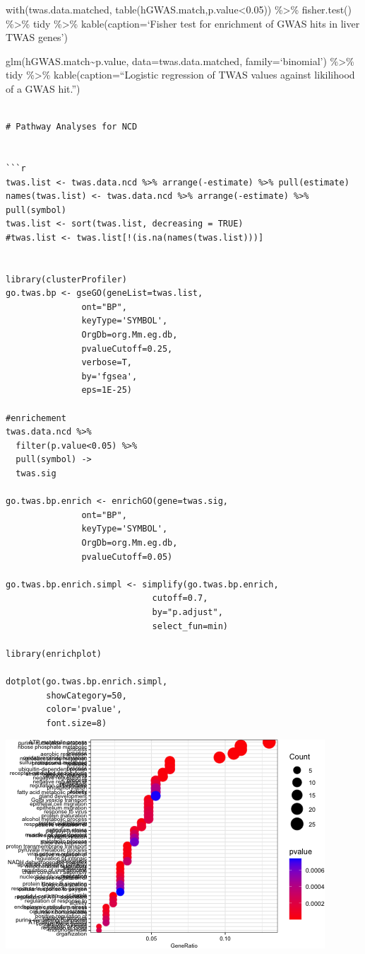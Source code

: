 \documentclass[
]{article}
\begin{document}
with(twas.data.matched, table(hGWAS.match,p.value\textless0.05))
\%\textgreater\% fisher.test() \%\textgreater\% tidy \%\textgreater\%
kable(caption=`Fisher test for enrichment of GWAS hits in liver TWAS
genes')

glm(hGWAS.match\textasciitilde p.value, data=twas.data.matched,
family=`binomial') \%\textgreater\% tidy \%\textgreater\%
kable(caption=``Logistic regression of TWAS values against likilihood of
a GWAS hit.'')

\begin{verbatim}

# Pathway Analyses for NCD


```r
twas.list <- twas.data.ncd %>% arrange(-estimate) %>% pull(estimate)
names(twas.list) <- twas.data.ncd %>% arrange(-estimate) %>% pull(symbol)
twas.list <- sort(twas.list, decreasing = TRUE)
#twas.list <- twas.list[!(is.na(names(twas.list)))]


library(clusterProfiler)
go.twas.bp <- gseGO(geneList=twas.list, 
               ont="BP", 
               keyType='SYMBOL',
               OrgDb=org.Mm.eg.db, 
               pvalueCutoff=0.25,
               verbose=T,
               by='fgsea',
               eps=1E-25)

#enrichement
twas.data.ncd %>% 
  filter(p.value<0.05) %>%
  pull(symbol) ->
  twas.sig

go.twas.bp.enrich <- enrichGO(gene=twas.sig, 
               ont="BP", 
               keyType='SYMBOL',
               OrgDb=org.Mm.eg.db, 
               pvalueCutoff=0.05)

go.twas.bp.enrich.simpl <- simplify(go.twas.bp.enrich,
                             cutoff=0.7, 
                             by="p.adjust",
                             select_fun=min)

library(enrichplot)

dotplot(go.twas.bp.enrich.simpl, 
        showCategory=50,
        color='pvalue',
        font.size=8)
\end{verbatim}

\includegraphics{figures/twas-go-1.png}
\end{document}
